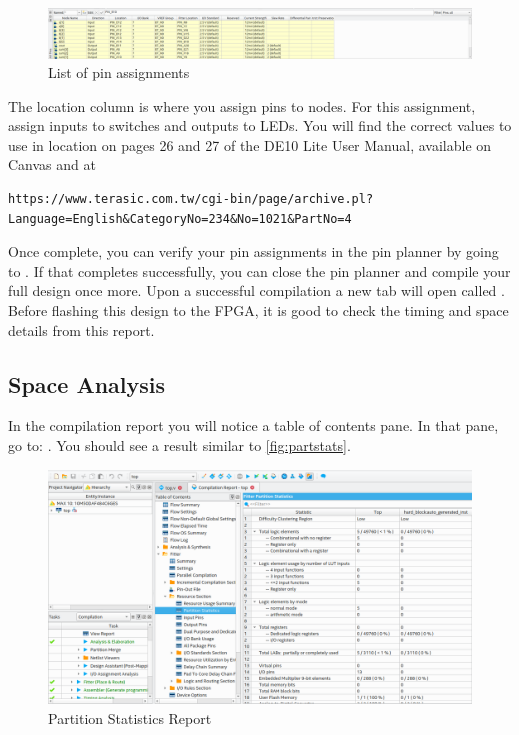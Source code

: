 \documentclass[12pt]{betterjournal}
\begin{document}
\begin{figure}
    \centering
    \includegraphics[width=\linewidth]{pinplannerpins.png}
    \caption{List of pin assignments}
    \label{fig:pinlist}
\end{figure}

The location column is where you assign pins to nodes. For this assignment, assign inputs to switches and outputs to LEDs. You will find the correct values to use in location on pages 26 and 27 of the DE10 Lite User Manual, available on Canvas and at 
\footnotesize
\begin{verbatim}
https://www.terasic.com.tw/cgi-bin/page/archive.pl?Language=English&CategoryNo=234&No=1021&PartNo=4
\end{verbatim}
\normalsize
Once complete, you can verify your pin assignments in the pin planner by going to . If that completes successfully, you can close the pin planner and compile your full design once more. Upon a successful compilation a new tab will open called . Before flashing this design to the FPGA, it is good to check the timing and space details from this report.

\subsection{Space Analysis}
\label{ss:spaceanalysis}
In the compilation report you will notice a table of contents pane. In that pane, go to: . You should see a result similar to \autoref{fig:partstats}.

\begin{figure}
    \centering
    \includegraphics[width=\linewidth]{spacereport.png}
    \caption{Partition Statistics Report}
    \label{fig:partstats}
\end{figure}
\end{document}
